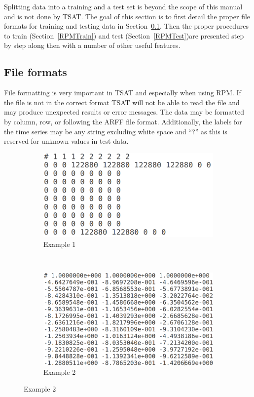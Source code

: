 \documentclass[letterpaper, 12pt]{article}
\begin{document}
Splitting data into a training and a test set is beyond the scope of this manual and is not done by TSAT. The goal of this section is to first detail the proper file formats for training and testing data in Section~\ref{RPMFile}. Then the proper procedures to train (Section~\ref{RPMTrain}) and test (Section~\ref{RPMTest})are presented step by step along then with a number of other useful features. 

\subsection{File formats}
\label{RPMFile}
File formatting is very important in TSAT and especially when using RPM.  If the file is not in the correct format TSAT will not be able to read the file and may produce unexpected results or error messages.  The data may be formatted by column, row, or following the ARFF file format. Additionally, the labels for the time series may be any string excluding white space and ``?'' as this is reserved for unknown values in test data.

\begin{figure}[h]
	\caption{Examples of RPM Data}
	\label{fig:rpm-data-exs}
	\begin{subfigure}[b]{0.5\textwidth}
		\includegraphics[width=\textwidth]{rpm_data_example_1}
		\caption{Example 1}
		\label{fig:rpm-data-ex-1}
	\end{subfigure}
	~
	\begin{subfigure}[b]{0.5\textwidth}
		\includegraphics[width=\textwidth]{rpm_data_example_2}
		\caption{Example 2}
		\label{fig:rpm-data-ex-2}
	\end{subfigure}
\end{figure}
\end{document}
